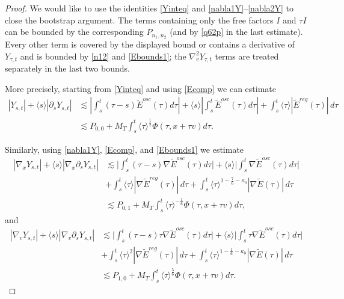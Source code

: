 \documentclass[reqno,11pt]{amsart}
\numberwithin{equation}{section}
\begin{document}
\begin{proof}
	We would like to use the identities \eqref{Yinteq} and \eqref{nabla1Y}--\eqref{nabla2Y} to close the bootstrap argument. The terms containing only the free factors $I$ and $\tau I$ can be bounded by the corresponding $P_{n_1,n_2}$ (and by
	\eqref{q62p} in the last
	estimate).  Every other term is covered by the displayed bound or contains
	a derivative of $Y_{\tau,t}$ and is bounded by \eqref{n12} and
	\eqref{Ebounds1}; the
	$\nabla_v^2Y_{\tau,t}$ terms are treated separately in the last two bounds. 
	
	More precisely, starting from \eqref{Yinteq} and using \eqref{Ecomp} we can estimate
	\begin{equation}\label{Ysu1}
		\begin{split}
			|Y_{s,t}|+\langle s\rangle	|\partial_sY_{s,t}|&\lesssim \left|\int_s^t(\tau-s) \widetilde{E}^{osc}(\tau)d\tau\right|+\langle s\rangle\left|\int_s^t \widetilde{E}^{osc}(\tau)d\tau\right|+\int_s^t\langle \tau\rangle| \widetilde{E}^{reg}(\tau)|\,d\tau\\&
			\lesssim 	P_{0,0}+M_T\int_s^t\langle \tau\rangle^{\frac{1}{2}}\Phi(\tau,x+\tau v)d\tau.
		\end{split}
	\end{equation}
	
	Similarly, using \eqref{nabla1Y}, \eqref{Ecomp}, and \eqref{Ebounds1} we estimate
	\begin{equation}\label{Ysu2}
		\begin{split}
			|\nabla_xY_{s,t}|+\langle s\rangle|\nabla_x\partial_sY_{s,t}|&\lesssim \Big|\int_s^t(\tau-s)\nabla \widetilde{E}^{osc}(\tau)d\tau\Big|+\langle s\rangle \Big|\int_s^t\nabla \widetilde{E}^{osc}(\tau)d\tau\Big|\\
			&+\int_s^t\langle \tau\rangle|\nabla \widetilde{E}^{reg}(\tau)|\,d\tau+\int_s^t\langle \tau\rangle^{1-\frac{7}{6}-\kappa_0}|\nabla \widetilde{E}(\tau)|\,d\tau\\
			&\lesssim	P_{0,1}+M_T\int_s^t\langle \tau\rangle^{-\frac{1}{6}}\Phi(\tau,x+\tau v)d\tau,
		\end{split}
	\end{equation}
	and
	\begin{equation}\label{Ysu3}
		\begin{split}
			|\nabla_vY_{s,t}|+\langle s\rangle|\nabla_v\partial_sY_{s,t}|&\lesssim \Big|\int_s^t(\tau-s)\tau\nabla \widetilde{E}^{osc}(\tau)d\tau\Big|+\langle s\rangle \Big|\int_s^t \tau\nabla \widetilde{E}^{osc}(\tau)d\tau\Big|\\
			&+\int_s^t\langle \tau\rangle^2|\nabla \widetilde{E}^{reg}(\tau)|\,d\tau+\int_s^t\langle \tau\rangle^{1-\frac{1}{6}-\kappa_0}|\nabla \widetilde{E}(\tau)|\,d\tau\\
			&\lesssim P_{1,0}+M_T\int_s^t\langle \tau\rangle^{\frac{5}{6}}\Phi(\tau,x+\tau v)d\tau.
		\end{split}
	\end{equation}
	

\end{proof}
\end{document}

